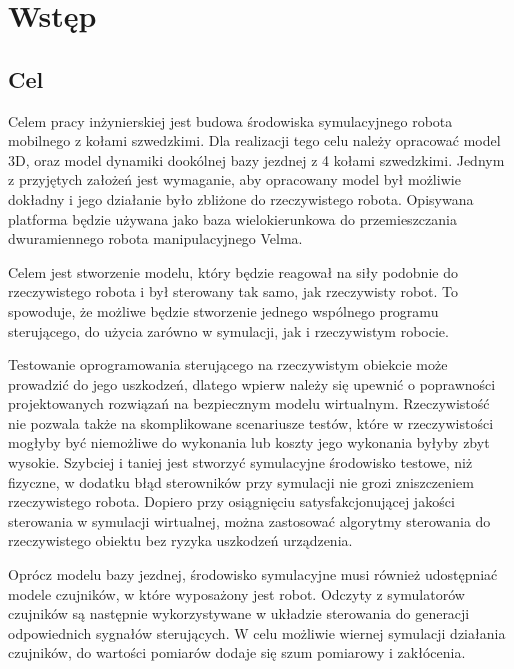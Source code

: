 \chapter{Wstęp}
	\section{Cel}
	Celem pracy inżynierskiej jest budowa środowiska symulacyjnego robota mobilnego z kołami szwedzkimi.
	Dla realizacji tego celu należy opracować model 3D, oraz model dynamiki dookólnej bazy jezdnej z 4 kołami szwedzkimi.
	Jednym z przyjętych założeń jest wymaganie, aby opracowany model był możliwie dokładny i jego działanie było zbliżone do rzeczywistego robota.
	Opisywana platforma będzie używana jako baza wielokierunkowa do przemieszczania dwuramiennego robota manipulacyjnego Velma.

	Celem jest stworzenie modelu, który będzie reagował na siły podobnie do rzeczywistego robota i był sterowany tak samo, jak rzeczywisty robot.
	To spowoduje, że możliwe będzie stworzenie jednego wspólnego programu sterującego, do użycia zarówno w symulacji, jak i rzeczywistym robocie.

	Testowanie oprogramowania sterującego na rzeczywistym obiekcie może prowadzić do jego uszkodzeń, 
	dlatego wpierw należy się upewnić o poprawności projektowanych rozwiązań na bezpiecznym modelu wirtualnym.
	Rzeczywistość nie pozwala także na skomplikowane scenariusze testów, które w rzeczywistości mogłyby być niemożliwe do wykonania lub koszty jego wykonania byłyby zbyt wysokie.
	Szybciej i taniej jest stworzyć symulacyjne środowisko testowe, niż fizyczne, w dodatku błąd sterowników przy symulacji nie grozi zniszczeniem rzeczywistego robota.
	Dopiero przy osiągnięciu satysfakcjonującej jakości sterowania w symulacji wirtualnej, 
	można zastosować algorytmy sterowania do rzeczywistego obiektu bez ryzyka uszkodzeń urządzenia.

	Oprócz modelu bazy jezdnej, środowisko symulacyjne musi również udostępniać modele czujników, w które wyposażony jest robot. 
	Odczyty z symulatorów czujników są następnie wykorzystywane w układzie sterowania do generacji odpowiednich sygnałów sterujących.
	W celu możliwie wiernej symulacji działania czujników, do wartości pomiarów dodaje się szum pomiarowy i zakłócenia.


